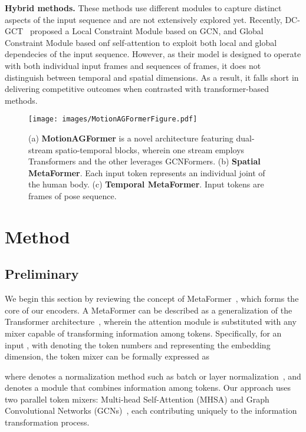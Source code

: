 \documentclass[10pt,twocolumn,letterpaper]{article}
\begin{document}
\textbf{Hybrid methods.} These methods use different modules to capture distinct aspects of the input sequence and are not extensively explored yet. Recently, DC-GCT~\cite{dc-gct} proposed a Local Constraint Module based on GCN, and Global Constraint Module based onf self-attention to exploit both local and global dependecies of the input sequence. However, as their model is designed to operate with both individual input frames and sequences of frames, it does not distinguish between temporal and spatial dimensions. As a result, it falls short in delivering competitive outcomes when contrasted with transformer-based methods.

\begin{figure*}
  \centering
  \texttt{[image: images/MotionAGFormerFigure.pdf]}
  \caption{(a) \textbf{MotionAGFormer} is a novel architecture featuring  dual-stream spatio-temporal blocks, wherein one stream employs Transformers and the other leverages GCNFormers. (b) \textbf{Spatial MetaFormer}. Each input token represents an individual joint of the human body. (c) \textbf{Temporal MetaFormer}. Input tokens are frames of pose sequence.}
  \label{fig:architecture}
\end{figure*}

\section{Method}
\subsection{Preliminary}
We begin this section by reviewing the concept of MetaFormer~\cite{yu2022metaformer}, which forms the core of our encoders. A MetaFormer can be described as a generalization of the Transformer architecture~\cite{vaswani2017attention}, wherein the attention module is substituted with any mixer capable of transforming information among tokens. Specifically, for an input , with  denoting the token numbers and  representing the embedding dimension, the token mixer can be formally expressed as

where  denotes a normalization method such as batch or layer normalization~\cite{ioffe2015batch, ba2016layer}, and  denotes a module that combines information among tokens. Our approach uses two parallel token mixers: Multi-head Self-Attention (MHSA) and Graph Convolutional Networks (GCNs)~\cite{kipf2016gcn}, each contributing uniquely to the information transformation process.
\end{document}

